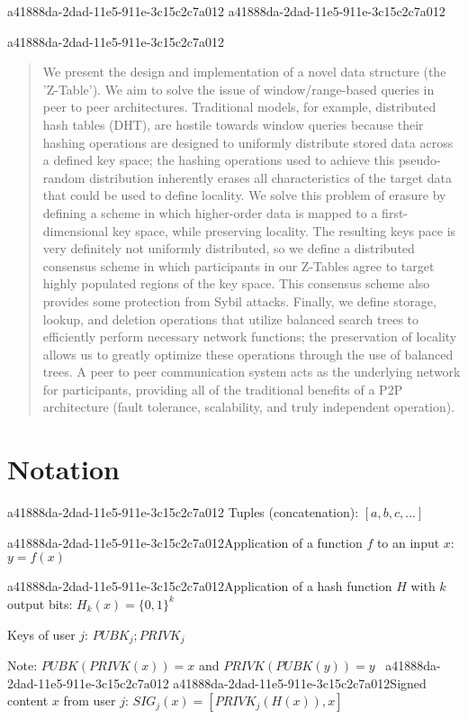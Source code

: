 \documentclass[12pt]{article}
\begin{document}
a41888da-2dad-11e5-911e-3c15c2c7a012
a41888da-2dad-11e5-911e-3c15c2c7a012\maketitle
a41888da-2dad-11e5-911e-3c15c2c7a012
\begin{abstract}
We present the design and implementation of a novel data structure (the 'Z-Table'). We aim to solve the issue of window/range-based queries in peer to peer architectures. Traditional models, for example,  distributed hash tables (DHT), are hostile towards window queries because their hashing operations are designed to uniformly distribute stored data across a defined key space; the hashing operations used to achieve this pseudo-random distribution inherently erases all characteristics of the target data that could be used to define locality. We solve this problem of erasure by defining a scheme in which higher-order data is mapped to a first-dimensional key space, while preserving locality. The resulting keys pace is very definitely not uniformly distributed, so we define a distributed consensus scheme in which participants in our Z-Tables agree to target highly populated regions of the key space. This consensus scheme also provides some protection from Sybil attacks. Finally, we define storage, lookup, and deletion operations that utilize balanced search trees to efficiently perform necessary network functions; the preservation of locality allows us to greatly optimize these operations through the use of balanced trees. A peer to peer communication system acts as the underlying network for participants, providing all of the traditional benefits of a P2P architecture (fault tolerance, scalability, and truly independent operation).
\end{abstract}

\section{Notation}
a41888da-2dad-11e5-911e-3c15c2c7a012
Tuples (concatenation): $[a,b,c,...]$

a41888da-2dad-11e5-911e-3c15c2c7a012Application of a function $f$ to an input $x$: $y=f(x)$

a41888da-2dad-11e5-911e-3c15c2c7a012Application of a hash function $H$ with $k$ output bits: $H_{k}(x) = \{0,1\}^k$

Keys of user $j$: $ PUBK_j; PRIVK_j $

Note: $PUBK(PRIVK(x)) = x$ and $PRIVK(PUBK(y)) = y$~
a41888da-2dad-11e5-911e-3c15c2c7a012
a41888da-2dad-11e5-911e-3c15c2c7a012Signed content $x$ from user $j$: $SIG_j(x) = \left[ PRIVK_j( H(x) ), x \right]$
\end{document}

